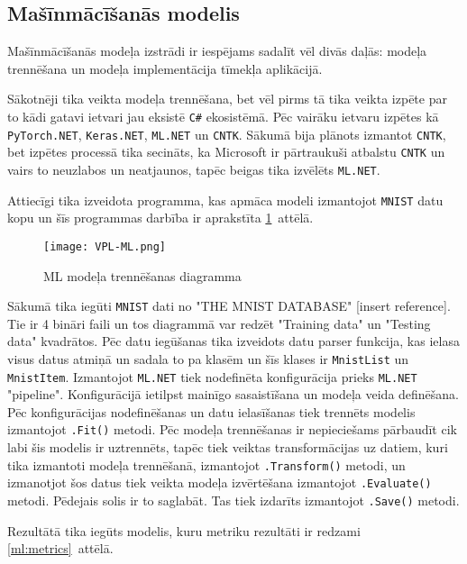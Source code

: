 \subsection{Mašīnmācīšanās modelis}

    Mašīnmācīšanās modeļa izstrādi ir iespējams sadalīt vēl divās daļās: modeļa trennēšana un modeļa
    implementācija tīmekļa aplikācijā.

    Sākotnēji tika veikta modeļa trennēšana, bet vēl pirms tā tika veikta izpēte par to kādi gatavi
    ietvari jau eksistē \texttt{C\#} ekosistēmā. Pēc vairāku ietvaru izpētes kā \texttt{PyTorch.NET},
    \texttt{Keras.NET}, \texttt{ML.NET} un \texttt{CNTK}. Sākumā bija plānots izmantot \texttt{CNTK},
    bet izpētes processā tika secināts, ka Microsoft ir pārtraukuši atbalstu \texttt{CNTK} un vairs
    to neuzlabos un neatjaunos, tapēc beigas tika izvēlēts \texttt{ML.NET}.

    Attiecīgi tika izveidota programma, kas apmāca modeli izmantojot \texttt{MNIST} datu kopu un
    šīs programmas darbība ir aprakstīta \ref{ml:train}~attēlā.

    \begin{figure}[H]
        \centering
        \texttt{[image: VPL-ML.png]}
        \caption{ML modeļa trennēšanas diagramma}
        \label{ml:train}
    \end{figure}

    Sākumā tika iegūti \texttt{MNIST} dati no "THE MNIST DATABASE" [insert reference]. Tie ir 4 bināri
    faili un tos diagrammā var redzēt "Training data" un "Testing data" kvadrātos. Pēc datu iegūšanas
    tika izveidots datu parser funkcija, kas ielasa visus datus atmiņā un sadala to pa klasēm un šīs
    klases ir \texttt{MnistList} un \texttt{MnistItem}. Izmantojot \texttt{ML.NET} tiek nodefinēta
    konfigurācija prieks \texttt{ML.NET} "pipeline". Konfigurācijā ietilpst mainīgo sasaistīšana un
    modeļa veida definēšana. Pēc konfigurācijas nodefinēšanas un datu ielasīšanas tiek trennēts modelis
    izmantojot \texttt{.Fit()} metodi. Pēc modeļa trennēšanas ir nepieciešams pārbaudīt cik labi šis
    modelis ir uztrennēts, tapēc tiek veiktas transformācijas uz datiem, kuri tika izmantoti modeļa
    trennēšanā, izmantojot \texttt{.Transform()} metodi, un izmanotjot šos datus tiek veikta modeļa
    izvērtēšana izmantojot \texttt{.Evaluate()} metodi. Pēdejais solis ir to saglabāt. Tas tiek izdarīts
    izmantojot \texttt{.Save()} metodi.

    Rezultātā tika iegūts modelis, kuru metriku rezultāti ir redzami \ref{ml:metrics}~attēlā.

